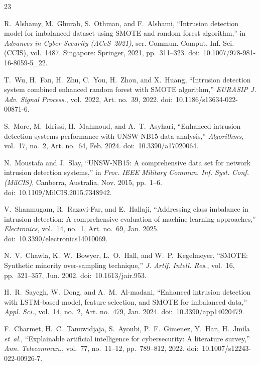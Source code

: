 \documentclass[conference,a4paper]{IEEEtran}
\begin{document}
\begin{thebibliography}{23}

R.~Alshamy, M.~Ghurab, S.~Othman, and F.~Alshami,
``Intrusion detection model for imbalanced dataset using SMOTE and random
forest algorithm,''
in \emph{Advances in Cyber Security (ACeS~2021)},
ser. Commun. Comput. Inf. Sci. (CCIS), vol.~1487.
Singapore: Springer, 2021, pp.~311--323.
doi:~10.1007/978-981-16-8059-5\_22.

T.~Wu, H.~Fan, H.~Zhu, C.~You, H.~Zhou, and X.~Huang,
``Intrusion detection system combined enhanced random forest with SMOTE
algorithm,''
\emph{EURASIP J. Adv. Signal Process.}, vol.~2022, Art. no.~39, 2022.
doi:~10.1186/s13634-022-00871-6.

S.~More, M.~Idrissi, H.~Mahmoud, and A.~T.~Asyhari,
``Enhanced intrusion detection systems performance with UNSW-NB15 data
analysis,''
\emph{Algorithms}, vol.~17, no.~2, Art. no.~64, Feb. 2024.
doi:~10.3390/a17020064.

N.~Moustafa and J.~Slay,
``UNSW-NB15: A comprehensive data set for network intrusion detection
systems,''
in \emph{Proc. IEEE Military Commun. Inf. Syst. Conf. (MilCIS)},
Canberra, Australia, Nov. 2015, pp.~1--6.
doi:~10.1109/MilCIS.2015.7348942.

V.~Shanmugam, R.~Razavi-Far, and E.~Hallaji,
``Addressing class imbalance in intrusion detection: A comprehensive
evaluation of machine learning approaches,''
\emph{Electronics}, vol.~14, no.~1, Art. no.~69, Jan. 2025.
doi:~10.3390/electronics14010069.

N.~V.~Chawla, K.~W.~Bowyer, L.~O.~Hall, and W.~P.~Kegelmeyer,
``SMOTE: Synthetic minority over-sampling technique,''
\emph{J. Artif. Intell. Res.}, vol.~16, pp.~321--357, Jun. 2002.
doi:~10.1613/jair.953.

H.~R.~Sayegh, W.~Dong, and A.~M.~Al-madani,
``Enhanced intrusion detection with LSTM-based model, feature selection,
and SMOTE for imbalanced data,''
\emph{Appl. Sci.}, vol.~14, no.~2, Art. no.~479, Jan. 2024.
doi:~10.3390/app14020479.

F.~Charmet, H.~C.~Tanuwidjaja, S.~Ayoubi, P.~F.~Gimenez, Y.~Han,
H.~Jmila \emph{et~al.},
``Explainable artificial intelligence for cybersecurity: A literature
survey,''
\emph{Ann. Telecommun.}, vol.~77, no.~11--12, pp.~789--812, 2022.
doi:~10.1007/s12243-022-00926-7.


\end{thebibliography}
\end{document}
